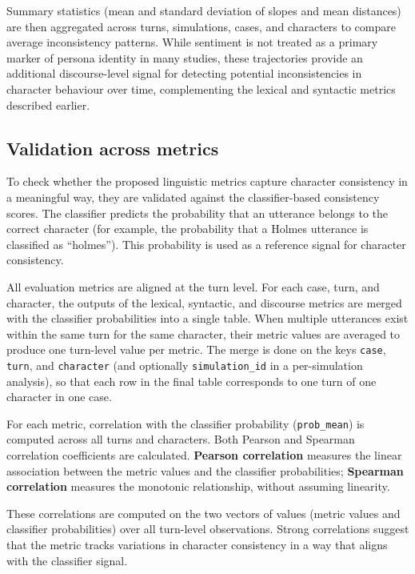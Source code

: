 \documentclass{article}
\begin{document}
Summary statistics (mean and standard deviation of slopes and mean distances) are then aggregated across turns, simulations, cases, and characters to compare average inconsistency patterns. While sentiment is not treated as a primary marker of persona identity in many studies, these trajectories provide an additional discourse-level signal for detecting potential inconsistencies in character behaviour over time, complementing the lexical and syntactic metrics described earlier.

\subsection{Validation across metrics} \label{sec:eval_validation}

To check whether the proposed linguistic metrics capture character consistency in a meaningful way, they are validated against the classifier-based consistency scores. The classifier predicts the probability that an utterance belongs to the correct character (for example, the probability that a Holmes utterance is classified as “holmes”). This probability is used as a reference signal for character consistency.

All evaluation metrics are aligned at the turn level. For each case, turn, and character, the outputs of the lexical, syntactic, and discourse metrics are merged with the classifier probabilities into a single table. When multiple utterances exist within the same turn for the same character, their metric values are averaged to produce one turn-level value per metric. The merge is done on the keys \texttt{case}, \texttt{turn}, and \texttt{character} (and optionally \texttt{simulation\_id} in a per-simulation analysis), so that each row in the final table corresponds to one turn of one character in one case.

For each metric, correlation with the classifier probability (\texttt{prob\_mean}) is computed across all turns and characters. Both Pearson and Spearman correlation coefficients are calculated. \textbf{Pearson correlation} measures the linear association between the metric values and the classifier probabilities; \textbf{Spearman correlation} measures the monotonic relationship, without assuming linearity.

These correlations are computed on the two vectors of values (metric values and classifier probabilities) over all turn-level observations. Strong correlations suggest that the metric tracks variations in character consistency in a way that aligns with the classifier signal.
\end{document}
